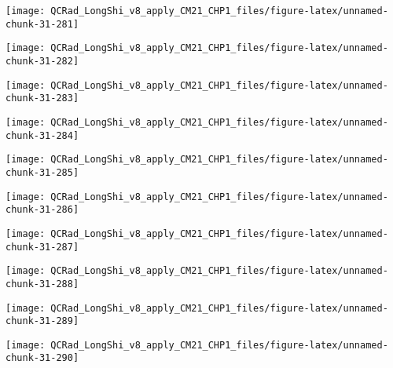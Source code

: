 \documentclass[
  10pt,
  a4paper,oneside]{article}
\begin{document}
\begin{center}\texttt{[image: QCRad\_LongShi\_v8\_apply\_CM21\_CHP1\_files/figure-latex/unnamed-chunk-31-281]} \end{center}

\begin{center}\texttt{[image: QCRad\_LongShi\_v8\_apply\_CM21\_CHP1\_files/figure-latex/unnamed-chunk-31-282]} \end{center}

\begin{center}\texttt{[image: QCRad\_LongShi\_v8\_apply\_CM21\_CHP1\_files/figure-latex/unnamed-chunk-31-283]} \end{center}

\begin{center}\texttt{[image: QCRad\_LongShi\_v8\_apply\_CM21\_CHP1\_files/figure-latex/unnamed-chunk-31-284]} \end{center}

\begin{center}\texttt{[image: QCRad\_LongShi\_v8\_apply\_CM21\_CHP1\_files/figure-latex/unnamed-chunk-31-285]} \end{center}

\begin{center}\texttt{[image: QCRad\_LongShi\_v8\_apply\_CM21\_CHP1\_files/figure-latex/unnamed-chunk-31-286]} \end{center}

\begin{center}\texttt{[image: QCRad\_LongShi\_v8\_apply\_CM21\_CHP1\_files/figure-latex/unnamed-chunk-31-287]} \end{center}

\begin{center}\texttt{[image: QCRad\_LongShi\_v8\_apply\_CM21\_CHP1\_files/figure-latex/unnamed-chunk-31-288]} \end{center}

\begin{center}\texttt{[image: QCRad\_LongShi\_v8\_apply\_CM21\_CHP1\_files/figure-latex/unnamed-chunk-31-289]} \end{center}

\begin{center}\texttt{[image: QCRad\_LongShi\_v8\_apply\_CM21\_CHP1\_files/figure-latex/unnamed-chunk-31-290]} \end{center}
\end{document}
